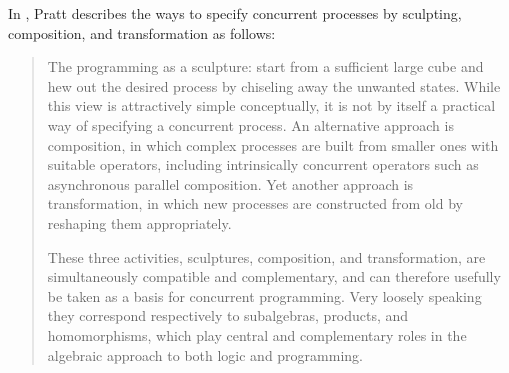     In \cite{Pratt00Sculptures}, Pratt describes the ways to specify concurrent processes by sculpting, composition, and transformation as follows:
    
    \begin{quote}
        The programming as a sculpture: start from a sufficient large cube and hew out the desired process by chiseling away the unwanted states.
        While this view is attractively simple conceptually, it is not by itself a practical way of specifying a concurrent process. An alternative approach is composition, in which complex processes are built from smaller ones with suitable operators, including intrinsically concurrent operators such as asynchronous parallel composition. Yet another approach is transformation, in which new processes are constructed from old by reshaping them appropriately.
    
        These three activities, sculptures, composition, and transformation, are simultaneously compatible and complementary, and can therefore usefully be taken as a basis for concurrent programming. Very loosely speaking they correspond respectively to subalgebras, products, and homomorphisms, which play central and complementary roles in the algebraic approach to both logic and programming.
    \end{quote}

    
    
    
